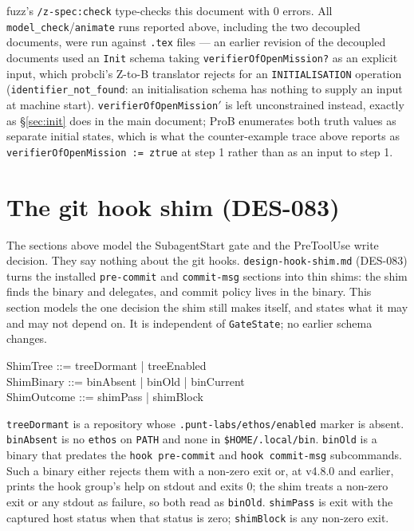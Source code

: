 \documentclass[a4paper,10pt,fleqn]{article}
\newcommand{\fpath}[1]{\texttt{#1}}
\newcommand{\field}[1]{\texttt{#1}}
\begin{document}
fuzz's \texttt{/z-spec:check} type-checks this document with 0 errors.
All \texttt{model\_check}/\texttt{animate} runs reported above,
including the two decoupled documents, were run against \texttt{.tex}
files --- an earlier revision of the decoupled documents used an
\field{Init} schema taking \field{verifierOfOpenMission?} as an
explicit input, which probcli's Z-to-B translator rejects for an
\field{INITIALISATION} operation (\field{identifier\_not\_found}: an
initialisation schema has nothing to supply an input at machine
start). \field{verifierOfOpenMission}$'$ is left unconstrained
instead, exactly as \S\ref{sec:init} does in the main document; ProB
enumerates both truth values as separate initial states, which is
what the counter-example trace above reports as
\field{verifierOfOpenMission := ztrue} at step 1 rather than as an
input to step 1.

\section{The git hook shim (DES-083)}
\label{sec:shim}

The sections above model the SubagentStart gate and the PreToolUse
write decision. They say nothing about the git hooks.
\fpath{design-hook-shim.md} (DES-083) turns the installed
\field{pre-commit} and \field{commit-msg} sections into thin shims: the
shim finds the binary and delegates, and commit policy lives in the
binary. This section models the one decision the shim still makes
itself, and states what it may and may not depend on. It is independent
of \field{GateState}; no earlier schema changes.

\begin{zed}
ShimTree ::= treeDormant | treeEnabled \\
ShimBinary ::= binAbsent | binOld | binCurrent \\
ShimOutcome ::= shimPass | shimBlock
\end{zed}

\field{treeDormant} is a repository whose
\field{.punt-labs/ethos/enabled} marker is absent. \field{binAbsent} is
no \field{ethos} on \field{PATH} and none in
\field{\$HOME/.local/bin}. \field{binOld} is a binary that predates the
\field{hook pre-commit} and \field{hook commit-msg} subcommands. Such a
binary either rejects them with a non-zero exit or, at v4.8.0 and earlier,
prints the hook group's help on stdout and exits 0; the shim treats a
non-zero exit or any stdout as failure, so both read as \field{binOld}.
\field{shimPass} is exit with the captured host status when that status
is zero; \field{shimBlock} is any non-zero exit.
\end{document}
